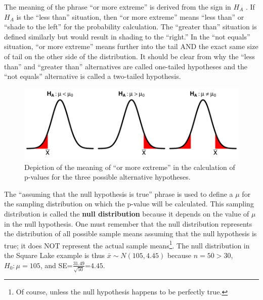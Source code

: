 \documentclass[10pt,openany]{book}\usepackage[]{graphicx}\usepackage[]{color}
\newenvironment{knitrout}{}{} %
\begin{document}

The meaning of the phrase ``or more extreme'' is derived from the sign in $H_{A}$ .  If $H_{A}$ is the ``less than'' situation, then ``or more extreme'' means ``less than'' or ``shade to the left'' for the probability calculation.  The ``greater than'' situation is defined similarly but would result in shading to the ``right.''  In the ``not equals'' situation, ``or more extreme'' means further into the tail AND the exact same size of tail on the other side of the distribution.  It should be clear from  why the ``less than'' and ``greater than'' alternatives are called one-tailed hypotheses and the ``not equals'' alternative is called a two-tailed hypothesis.

\begin{knitrout}
\color{fgcolor}\begin{figure}[hbtp]

{\centering \includegraphics[width=.8\linewidth]{Figs/HOtails-1} 

}

\caption[Depiction of the meaning of ``or more extreme'' in the calculation of p-values for the three possible alternative hypotheses]{Depiction of the meaning of ``or more extreme'' in the calculation of p-values for the three possible alternative hypotheses.}\label{fig:HOtails}
\end{figure}


\end{knitrout}

The ``assuming that the null hypothesis is true'' phrase is used to define a $\mu$ for the sampling distribution on which the p-value will be calculated.  This sampling distribution is called the \textbf{null distribution} because it depends on the value of $\mu$ in the null hypothesis.  One must remember that the null distribution represents the distribution of all possible sample means assuming that the null hypothesis is true; it does NOT represent the actual sample means\footnote{Of course, unless the null hypothesis happens to be perfectly true.}.  The null distribution in the Square Lake example is thus $\bar{x}\sim N(105,4.45)$ because $n=50>30$, $H_{0}:\mu=105$, and SE=$\frac{31.49}{\sqrt{50}}$=$4.45$.
\end{document}
